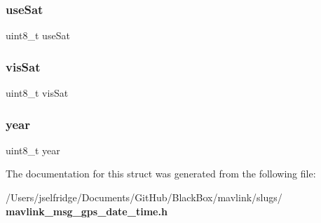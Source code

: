 \subsubsection{use\+Sat}
{\footnotesize\ttfamily uint8\+\_\+t use\+Sat}

\mbox{\label{struct____mavlink__gps__date__time__t_a760fcdd93552a37a4e2ef4087a073a27}} 
\subsubsection{vis\+Sat}
{\footnotesize\ttfamily uint8\+\_\+t vis\+Sat}

\mbox{\label{struct____mavlink__gps__date__time__t_a7af2065789bc84419b8d5fe109be83b5}} 
\subsubsection{year}
{\footnotesize\ttfamily uint8\+\_\+t year}



The documentation for this struct was generated from the following file\+:\begin{DoxyCompactItemize}
\item 
/\+Users/jselfridge/\+Documents/\+Git\+Hub/\+Black\+Box/mavlink/slugs/\textbf{ mavlink\+\_\+msg\+\_\+gps\+\_\+date\+\_\+time.\+h}\end{DoxyCompactItemize}
